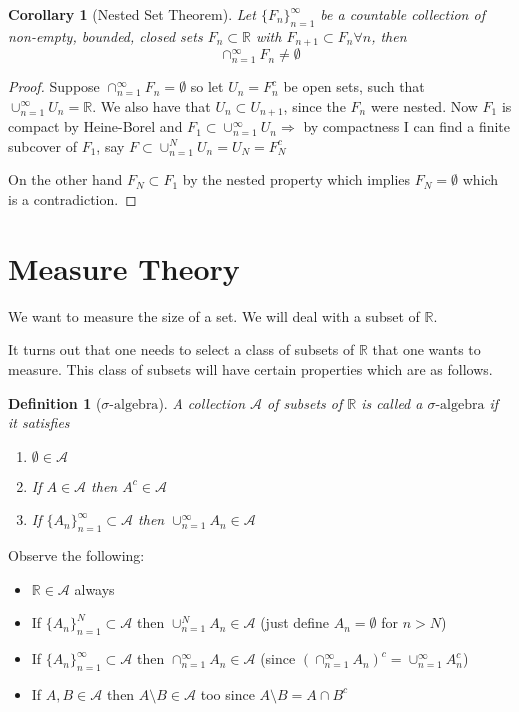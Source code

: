 \documentclass[11pt]{article}
\newtheorem{corollary}{Corollary}[theorem]
\newtheorem{definition}{Definition}[section]
\newcommand{\siga}{\sigma\text{-algebra}}
\begin{document}
    \begin{corollary}[Nested Set Theorem]
        Let $\{ F_n \}_{n=1}^{\infty}$ be a countable collection of non-empty, bounded, closed sets $F_n \subset \mathbb{R}$ with $F_{n+1} \subset F_n \forall n$, then
        \[
            \cap_{n=1}^{\infty} F_n \neq \emptyset
        \]
    \end{corollary}

    \begin{proof}
        Suppose $\cap_{n=1}^{\infty} F_n = \emptyset$ so let $U_n = F_{n}^{c}$ be open sets, such that $\cup_{n=1}^{\infty} U_n = \mathbb{R}$.
        We also have that $U_n \subset U_{n+1}$, since the $F_n$ were nested.
        Now $F_1$ is compact by Heine-Borel and $F_1 \subset \cup_{n=1}^{\infty} U_n \Rightarrow $ by compactness
        I can find a finite subcover of $F_1$, say $F \subset \cup_{n=1}^{N} U_n = U_N = F_N ^{c}$

        On the other hand $F_N \subset F_1$ by the nested property which implies $F_N = \emptyset$ which is a contradiction.
    \end{proof}


    \section{Measure Theory}\label{sec:measure-theory}

    We want to measure the size of a set.
    We will deal with a subset of $\mathbb{R}$.

    It turns out that one needs to select a class of subsets of $\mathbb{R}$ that one wants to measure.
    This class of subsets will have certain properties which are as follows.

    \begin{definition}[$\siga$]
        A collection $\mathcal{A}$ of subsets of $\mathbb{R}$ is called a $\siga$ if it satisfies
        \begin{enumerate}
            \item $\emptyset \in \mathcal{A}$
            \item If $A \in \mathcal{A}$ then $A^c \in \mathcal{A}$
            \item If $\{ A_n \}_{n=1}^{\infty} \subset \mathcal{A}$ then $\cup_{n=1}^{\infty} A_n \in \mathcal{A}$
        \end{enumerate}
    \end{definition}

    Observe the following:
    \begin{itemize}
        \item $\mathbb{R} \in \mathcal{A}$ always
        \item If $\{ A_n \}_{n=1}^{N} \subset \mathcal{A}$ then $\cup_{n=1}^{N} A_n \in \mathcal{A}$ (just define $A_n = \emptyset$ for $n > N$)
        \item If $\{ A_n \}_{n=1}^{\infty} \subset \mathcal{A}$ then $\cap_{n=1}^{\infty} A_n \in \mathcal{A}$ (since $(\cap_{n=1}^{\infty} A_n)^c = \cup_{n=1}^{\infty} A_{n}^{c}$)
        \item If $A,B \in \mathcal{A}$ then $A \setminus B \in \mathcal{A}$ too since $A \setminus B = A \cap B^c$
    \end{itemize}
\end{document}
